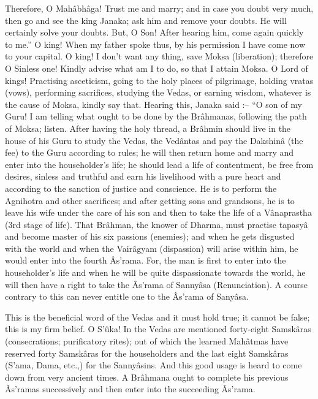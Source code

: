 Therefore, O Mahâbhâga! Trust me and marry; and in case you doubt very much, then go and see the king Janaka; ask him and remove your doubts. He will certainly solve your doubts. But, O Son! After hearing him, come again quickly to me.” O king! When my father spoke thus, by his permission I have come now to your capital. O king! I don't want any thing, save Moksa (liberation); therefore O Sinless one! Kindly advise what am I to do, so that I attain Moksa. O Lord of kings! Practising asceticism, going to the holy places of pilgrimage, holding vratas (vows), performing sacrifices, studying the Vedas, or earning wisdom, whatever is the cause of Moksa, kindly say that. Hearing this, Janaka said :-- “O son of my Guru! I am telling what ought to be done by the Brâhmanas, following the path of Moksa; listen. After having the holy thread, a Brâhmin should live in the house of his Guru to study the Vedas, the Vedântas and pay the Dakshinâ (the fee) to the Guru according to rules; he will then return home and marry and enter into the householder's life; he should lead a life of contentment, be free from desires, sinless and truthful and earn his livelihood with a pure heart and according to the sanction of justice and conscience. He is to perform the Agnihotra and other sacrifices; and after getting sons and grandsons, he is to leave his wife under the care of his son and then to take the life of a Vânaprastha (3rd stage of life). That Brâhman, the knower of Dharma, must practise tapasyâ and become master of his six passions (enemies); and when he gets disgusted with the world and when the Vairâgyam (dispassion) will arise within him, he would enter into the fourth Âs'rama. For, the man is first to enter into the householder's life and when he will be quite dispassionate towards the world, he will then have a right to take the Âs’rama of Sannyâsa (Renunciation). A course contrary to this can never entitle one to the Âs’rama of Sanyâsa.

 

This is the beneficial word of the Vedas and it must hold true; it cannot be false; this is my firm belief. O S’ûka! In the Vedas are mentioned forty-eight Samskâras (consecrations; purificatory rites); out of which the learned Mahâtmas have reserved forty Samskâras for the householders and the last eight Samskâras (S'ama, Dama, etc.,) for the Sannyâsins. And this good usage is heard to come down from very ancient times. A Brâhmana ought to complete his previous Âs’ramas successively and then enter into the succeeding Âs’rama.

